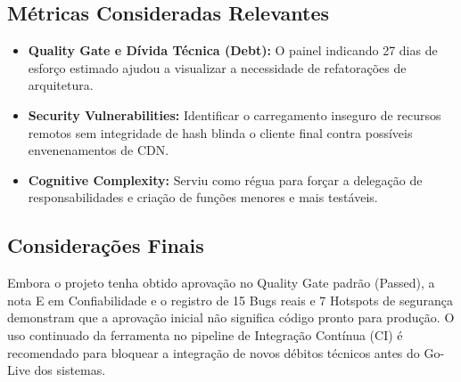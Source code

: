 \documentclass[12pt,a4paper]{article}
\begin{document}
\subsection{Métricas Consideradas Relevantes}
\begin{itemize}
    \item \textbf{Quality Gate e Dívida Técnica (Debt):} O painel indicando 27 dias de esforço estimado ajudou a visualizar a necessidade de refatorações de arquitetura.
    \item \textbf{Security Vulnerabilities:} Identificar o carregamento inseguro de recursos remotos sem integridade de hash blinda o cliente final contra possíveis envenenamentos de CDN.
    \item \textbf{Cognitive Complexity:} Serviu como régua para forçar a delegação de responsabilidades e criação de funções menores e mais testáveis.
\end{itemize}

\subsection{Considerações Finais}
Embora o projeto tenha obtido aprovação no Quality Gate padrão (Passed), a nota E em Confiabilidade e o registro de 15 Bugs reais e 7 Hotspots de segurança demonstram que a aprovação inicial não significa código pronto para produção. O uso continuado da ferramenta no pipeline de Integração Contínua (CI) é recomendado para bloquear a integração de novos débitos técnicos antes do Go-Live dos sistemas.
\end{document}
